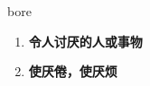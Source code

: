 
\begin{frame}
{\huge bore}
\begin{center}
\begin{enumerate}\Large
  \item \textbf{令人讨厌的人或事物}
  \item \textbf{使厌倦，使厌烦}
\end{enumerate}
\end{center}
\end{frame}
